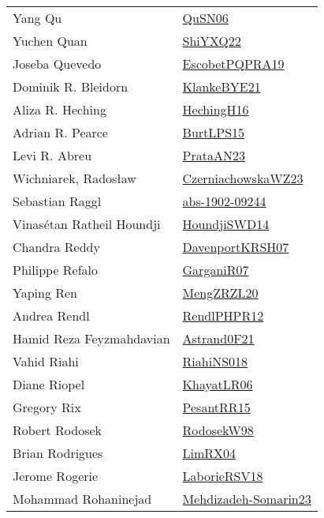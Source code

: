 {\begin{longtable}{p{4cm}p{20cm}}
Yang Qu & \href{papers/QuSN06.pdf}{QuSN06}\cite{QuSN06} \\
Yuchen Quan & \href{}{ShiYXQ22}\cite{ShiYXQ22} \\
Joseba Quevedo & \href{articles/EscobetPQPRA19.pdf}{EscobetPQPRA19}\cite{EscobetPQPRA19} \\
Dominik R. Bleidorn & \href{papers/KlankeBYE21.pdf}{KlankeBYE21}\cite{KlankeBYE21} \\
Aliza R. Heching & \href{papers/HechingH16.pdf}{HechingH16}\cite{HechingH16} \\
Adrian R. Pearce & \href{papers/BurtLPS15.pdf}{BurtLPS15}\cite{BurtLPS15} \\
Levi R. Abreu & \href{articles/PrataAN23.pdf}{PrataAN23}\cite{PrataAN23} \\
Wichniarek, Radosław & \href{articles/CzerniachowskaWZ23.pdf}{CzerniachowskaWZ23}\cite{CzerniachowskaWZ23} \\
Sebastian Raggl & \href{articles/abs-1902-09244.pdf}{abs-1902-09244}\cite{abs-1902-09244} \\
Vinas{\'{e}}tan Ratheil Houndji & \href{papers/HoundjiSWD14.pdf}{HoundjiSWD14}\cite{HoundjiSWD14} \\
Chandra Reddy & \href{papers/DavenportKRSH07.pdf}{DavenportKRSH07}\cite{DavenportKRSH07} \\
Philippe Refalo & \href{papers/GarganiR07.pdf}{GarganiR07}\cite{GarganiR07} \\
Yaping Ren & \href{articles/MengZRZL20.pdf}{MengZRZL20}\cite{MengZRZL20} \\
Andrea Rendl & \href{papers/RendlPHPR12.pdf}{RendlPHPR12}\cite{RendlPHPR12} \\
Hamid Reza Feyzmahdavian & \href{papers/Astrand0F21.pdf}{Astrand0F21}\cite{Astrand0F21} \\
Vahid Riahi & \href{papers/RiahiNS018.pdf}{RiahiNS018}\cite{RiahiNS018} \\
Diane Riopel & \href{articles/KhayatLR06.pdf}{KhayatLR06}\cite{KhayatLR06} \\
Gregory Rix & \href{papers/PesantRR15.pdf}{PesantRR15}\cite{PesantRR15} \\
Robert Rodosek & \href{papers/RodosekW98.pdf}{RodosekW98}\cite{RodosekW98} \\
Brian Rodrigues & \href{papers/LimRX04.pdf}{LimRX04}\cite{LimRX04} \\
Jerome Rogerie & \href{articles/LaborieRSV18.pdf}{LaborieRSV18}\cite{LaborieRSV18} \\
Mohammad Rohaninejad & \href{papers/Mehdizadeh-Somarin23.pdf}{Mehdizadeh-Somarin23}\cite{Mehdizadeh-Somarin23} \\

\end{longtable}}
